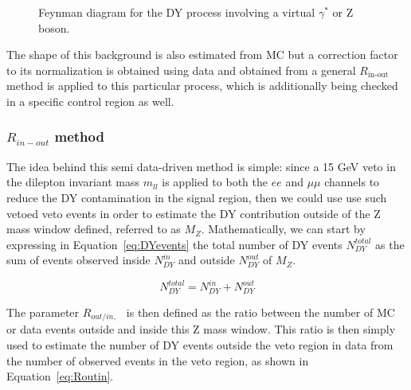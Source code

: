 \documentclass[a4paper, 10pt, openright]{report}
\begin{document}
\begin{figure}[htbp]
\centering
\begin{minipage}[b]{.34\textwidth}
\end{minipage} 
\caption{Feynman diagram for the \ac{DY} process involving a virtual $\gamma^*$ or Z boson.}
\label{fig:DY}
\end{figure}

The shape of this background is also estimated from \ac{MC} but a correction factor to its normalization is obtained using data and obtained from a general $R_{\text{in-out}}$ method is applied to this particular process, which is additionally being checked in a specific control region as well.

\subsubsection{$R_{in-out}$ method} \label{subsection:rinout}

The idea behind this semi data-driven method is simple: since a 15 GeV veto in the dilepton invariant mass $m_{ll}$ is applied to both the $ee$ and $\mu \mu$ channels to reduce the \ac{DY} contamination in the signal region, then we could use use such vetoed veto events in order to estimate the \ac{DY} contribution outside of the Z mass window defined, referred to as $M_Z$. Mathematically, we can start by expressing in Equation~\ref{eq:DYevents} the total number of \ac{DY} events $N_{DY}^{total}$ as the sum of events observed inside $N_{DY}^{in}$ and outside $N_{DY}^{out}$ of $M_Z$.

\begin{equation}
\label{eq:DYevents}
N_{DY}^{total} = N_{DY}^{in} + N_{DY}^{out}
\end{equation}

The parameter $R_{out/in,\text{ }}$ is then defined as the ratio between the number of \ac{MC} or data events outside and inside this Z mass window. This ratio is then simply used to estimate the number of DY events outside the veto region in data from the number of observed events in the veto region, as shown in Equation~\ref{eq:Routin}.
\end{document}

